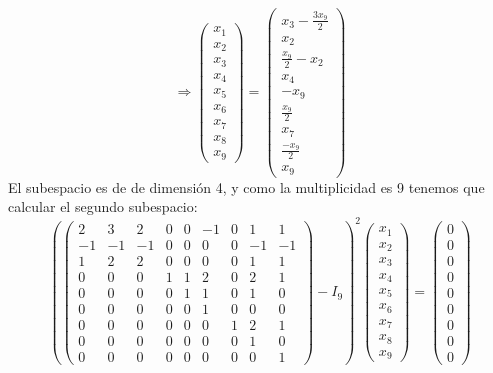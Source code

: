 \documentclass{article}
\begin{document}
$$
\Rightarrow
\left(\begin{array}{c}
    x_1\\
    x_2 \\
    x_3 \\
    x_4 \\
    x_5 \\
    x_6 \\
    x_7 \\
    x_8 \\
    x_9
\end{array}\right)
=
\left(\begin{array}{c}
    x_3- \frac{3x_9}{2}\\
    x_2 \\
    \frac{x_9}{2}-x_2 \\
    x_4 \\
    -x_9 \\
    \frac{x_9}{2} \\
    x_7 \\
    \frac{-x_9}{2}\\%
    x_9
\end{array}\right)
$$
El subespacio es de de dimensión 4, y como la multiplicidad es 9 tenemos que calcular el segundo subespacio:
$$
\left(
\left(\begin{array}{ccccccccc}
     2 & 3 & 2 & 0 & 0 &-1 & 0 & 1 & 1\\
    -1 &-1 &-1 & 0 & 0 & 0 & 0 &-1 &-1\\
     1 & 2 & 2 & 0 & 0 & 0 & 0 & 1 & 1\\
     0 & 0 & 0 & 1 & 1 & 2 & 0 & 2 & 1\\
     0 & 0 & 0 & 0 & 1 & 1 & 0 & 1 & 0\\
     0 & 0 & 0 & 0 & 0 & 1 & 0 & 0 & 0\\
     0 & 0 & 0 & 0 & 0 & 0 & 1 & 2 & 1\\
     0 & 0 & 0 & 0 & 0 & 0 & 0 & 1 & 0\\
     0 & 0 & 0 & 0 & 0 & 0 & 0 & 0 & 1
\end{array}\right)-I_9
\right)^2
\left(\begin{array}{c}
    x_1\\
    x_2 \\
    x_3 \\
    x_4 \\
    x_5 \\
    x_6 \\
    x_7 \\
    x_8 \\
    x_9
\end{array}\right)
=
\left(\begin{array}{c}
    0\\
    0 \\
    0 \\
    0 \\
    0 \\
    0 \\
    0 \\
    0 \\
    0
\end{array}\right)
$$
\end{document}
